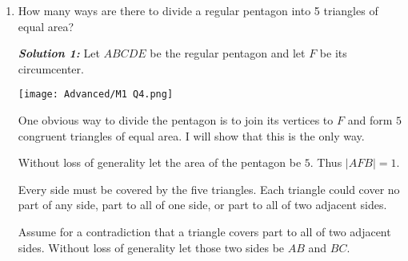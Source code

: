 \documentclass[12pt]{article}
\newcommand{\solnum}[1]{\textbf{\textit{Solution #1: }}}
\begin{document}
\begin{enumerate}[topsep=\bigskipamount,itemsep=\bigskipamount,leftmargin=0pt]
\solnum{3}
Let \(x = r^{1/3}\), \(y = s^{1/3}\), and \(z = t^{1/3}\). We have
\begin{align*}
    &\mathrel{\phantom{=}} r^{2} + s^{2} + t^{2} + 2rst + 1 & & \\
    &= x^{6} + y^{6} + z^{6} + (x^{3}y^{3}z^{3} + x^{3}y^{3}z^{3} + 1) & & \\
    &\geqslant x^{6} + y^{6} + z^{6} + 3x^{2}y^{2}z^{2} & & \textrm{(AM-GM)}\\
    &\geqslant (x^{4}y^{2} + x^{2}y^{4}) + (y^{4}z^{2} + y^{2}z^{4}) + (x^{4}z^{2} + x^{2}z^{4}) & & \textrm{(Schur)}\\
    &\geqslant 2x^{3}y^{3} + 2y^{3}z^{3} + 2z^{3}x^{3} & & \textrm{(AM-GM)}\\
    &= 2(rs + st + tr).
\end{align*}

\solnum{4}
By AM-GM for \(rst\), \(rst\), and 1, we have
\begin{align*}
    &\phantom{=} r^{2} + s^{2} + t^{2} + 2rst + 1\\
    &\geqslant r^{2} + s^{2} + t^{2} + 3(rst)^{2/3}\\
    &\geqslant 2(rs + st + tr)
\end{align*}
by Popoviciu's inequality applied to the convex function \(\mathbb{R} \implies \mathbb{R}: x \mapsto e^{x}\) and the numbers \(2 \ln r\), \(2 \ln s\), and \(2 \ln t\).

\item 
How many ways are there to divide a regular pentagon into 5 triangles of equal area?

\solnum{1}
Let $ABCDE$ be the regular pentagon 
and let $F$ be its circumcenter.

\texttt{[image: Advanced/M1 Q4.png]}

One obvious way to divide the pentagon
is to join its vertices to $F$
and form $5$ congruent triangles of equal area.
I will show that this is the only way.

Without loss of generality let the area of the pentagon be $5$.
Thus $|AFB| = 1$.

Every side must be covered by the five triangles.
Each triangle could cover no part of any side, part to all of one side, or part to all of two adjacent sides.

Assume for a contradiction that a triangle covers part to all of two adjacent sides.
Without loss of generality let those two sides be $AB$ and $BC$.


\end{enumerate}
\end{document}
